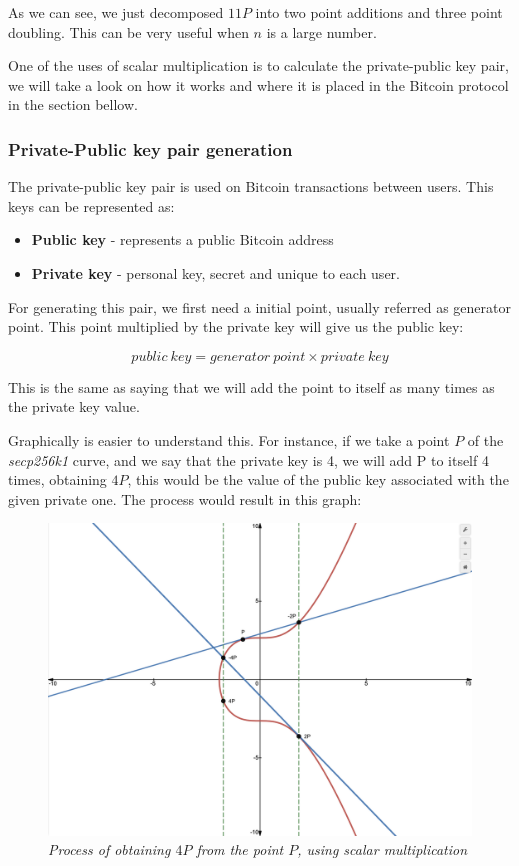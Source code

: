 \documentclass{article}
\newcommand\tab[1][1cm]{\hspace*{#1}}
\begin{document}
As we can see, we just decomposed \(11P\) into two point additions and three point doubling. This can be very useful when \(n\) is a large number.

One of the uses of scalar multiplication is to calculate the private-public key pair, we will take a look on how it works and where it is placed in the Bitcoin protocol in the section bellow.

\subsubsection{Private-Public key pair generation}

\tab The private-public key pair is used on Bitcoin transactions between users. This keys can be represented as:

\begin{itemize}
    \item \textbf{Public key} - represents a public Bitcoin address
    \item \textbf{Private key} - personal key, secret and unique to each user.
\end{itemize}

For generating this pair, we first need a initial point, usually referred as generator point. This point multiplied by the private key will give us the public key:

\[public\: key = generator\: point \times private\: key\]

This is the same as saying that we will add the point to itself as many times as the private key value.

Graphically is easier to understand this. For instance, if we take a point \(P\) of the \textit{secp256k1} curve, and we say that the private key is 4, we will add P to itself 4 times, obtaining \(4P\), this would be the value of the public key associated with the given private one. The process would result in this graph:

\begin{figure}[H]
    \begin{center}
        \includegraphics[width=0.5 \textwidth]{images/Kobiltz_curve_with_points.png}
        \caption{\textit{Process of obtaining \(4P\) from the point \(P\), using scalar multiplication}}
    \end{center}
\end{figure}
\end{document}
